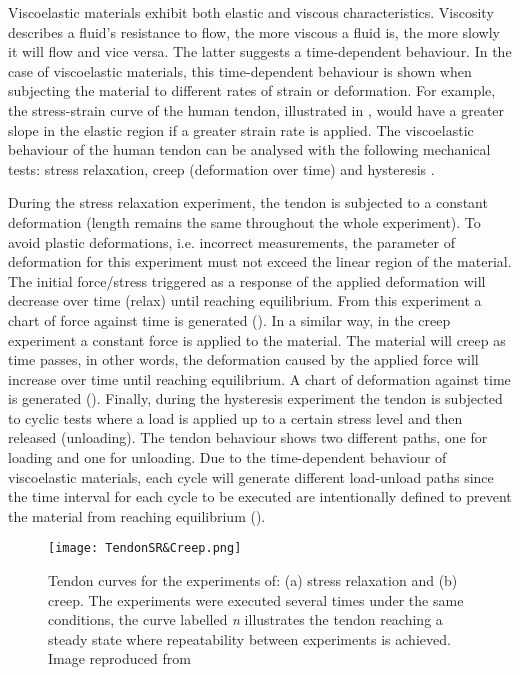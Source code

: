 Viscoelastic materials exhibit both elastic and viscous characteristics. Viscosity describes a fluid's resistance to flow, the more viscous a fluid is, the more slowly it will flow and vice versa. The latter suggests a time-dependent behaviour. In the case of viscoelastic materials, this time-dependent behaviour is shown when subjecting the material to different rates of strain or deformation. For example, the stress-strain curve of the human tendon, illustrated in , would have a greater slope in the elastic region if a greater strain rate is applied. The viscoelastic behaviour of the human tendon can be analysed with the following mechanical tests: stress relaxation, creep (deformation over time) and hysteresis \cite{nordin2001basic}.

During the stress relaxation experiment, the tendon is subjected to a constant deformation (length remains the same throughout the whole experiment). To avoid plastic deformations, i.e. incorrect measurements, the parameter of deformation for this experiment must not exceed the linear region of the material. The initial force/stress triggered as a response of the applied deformation will decrease over time (relax) until reaching equilibrium. From this experiment a chart of force against time is generated (). In a similar way, in the creep experiment a constant force is applied to the material. The material will creep as time passes, in other words, the deformation caused by the applied force will increase over time until reaching equilibrium. A chart of deformation against time is generated (). Finally, during the hysteresis experiment the tendon is subjected to cyclic tests where a load is applied up to a certain stress level and then released (unloading). The tendon behaviour shows two different paths, one for loading and one for unloading. Due to the time-dependent behaviour of viscoelastic materials, each cycle will generate different load-unload paths since the time interval for each cycle to be executed are intentionally defined to prevent the material from reaching equilibrium ().

\begin{figure}[htb!]
	\centering
	\texttt{[image: TendonSR\&Creep.png]}
	\caption[Tendon curves for the experiments of: (a) stress relaxation and (b) creep. The experiments were executed several times under the same conditions, the curve labelled \textit{n} illustrates the tendon reaching a steady state where repeatability between experiments is achieved.]{Tendon curves for the experiments of: (a) stress relaxation and (b) creep. The experiments were executed several times under the same conditions, the curve labelled \textit{n} illustrates the tendon reaching a steady state where repeatability between experiments is achieved. Image reproduced from \cite{maurel1998biomechanical} }
	\label{fig:tendonSR_Creep}
\end{figure}

